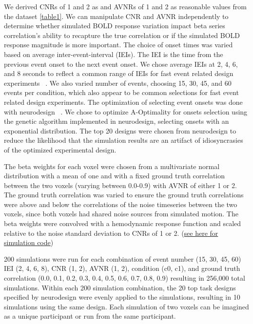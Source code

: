 \documentclass[10pt,letterpaper]{article}
\begin{document}
We derived CNRs of 1 and 2 as and AVNRs of 1 and 2 as reasonable values from the dataset \ref{table1}.
We can manipulate CNR and AVNR independently to determine whether simulated BOLD response variation
impact beta series correlation's ability to recapture the true correlation or if the simulated BOLD
response magnitude is more important.
The choice of onset times was varied based on average inter-event-interval (IEIs).
The IEI is the time from the previous event onset to the next event onset.
We chose average IEIs at 2, 4, 6, and 8 seconds to reflect a common range of IEIs
for fast event related design experiments ~\cite{Hennigan2015,Dichter2007,Goghari2009}.
We also varied number of events, choosing 15, 30, 45, and 60 events per condition,
which also appear to be common selections for fast event related design experiments.
The optimization of selecting event onsets was done with neurodesign ~\cite{Durnez2018}.
We chose to optimize A-Optimality for onsets selection using the genetic algorithm implemented
in neurodesign, selecting onsets with an exponential distribution.
The top 20 designs were chosen from neurodesign to reduce the likelihood
that the simulation results are an artifact of idiosyncrasies
of the optimized experimental design.

The beta weights for each voxel were chosen from a multivariate normal distribution
with a mean of one and with a fixed ground truth correlation between the two voxels 
(varying between 0.0-0.9) with AVNR of either 1 or 2.
The ground truth correlation was varied to ensure the ground truth correlations were above
and below the correlations of the noise timeseries between the two voxels,
since both voxels had shared noise sources from simulated motion.
The beta weights were convolved with a hemodynamic response function and scaled
relative to the noise standard deviation to CNRs of 1 or 2.
(\href{https://github.com/jdkent/betaSeriesSimulations/tree/38dfbf2d83a8ab742d134c490b850ad893c8b4c7/beta_sim}{see here for simulation code})

200 simulations were run for each combination of event number
(15, 30, 45, 60) IEI (2, 4, 6, 8),  CNR (1, 2), AVNR (1, 2), condition (c0, c1),
and ground truth correlation
(0.0, 0.1, 0.2, 0.3, 0.4, 0.5, 0.6, 0.7, 0.8, 0.9)
resulting in 256,000 total simulations.
Within each 200 simulation combination, the 20 top task designs specified by
neurodesign were evenly applied to the simulations, resulting in 10 simulations
using the same design.
Each simulation of two voxels can be imagined as a unique participant or run from
the same participant.
\end{document}
